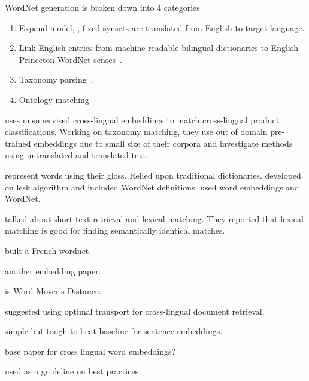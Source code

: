 WordNet generation is broken down into 4 categories
\begin{enumerate}
    \item Expand model, \textcite{vossen_introduction_1998}, fixed synsets are translated from English to target language.
    \item Link English entries from machine-readable bilingual dictionaries to English Princeton WordNet senses~\textcite{knight_building_1994}.
    \item Taxonomy parsing~\textcite{farreres_using_1998}.
    \item Ontology matching~\textcite{farreres_towards_2004}
\end{enumerate}

\textcite{gordeev_unsupervised_2018} uses unsupervised cross-lingual embeddings to match cross-lingual product classifications.
Working on taxonomy matching, they use out of domain pre-trained embeddings due to small size of their corpora and investigate methods using untranslated and translated text.

\textcite{lesk_automatic_1986} represent words using their gloss. Relied upon traditional dictionaries.
\textcite{banerjee_adapted_2002} developed on lesk algorithm and included WordNet definitions.
\textcite{khodak_automated_2017} used word embeddings and WordNet.

\textcite{metzler_similarity_2007} talked about short text retrieval and lexical matching. They reported that lexical matching is good for finding semantically identical matches.

\textcite{sagot_building_2008} built a French wordnet.

\textcite{xiao_distributed_2014} another embedding paper.

\textcite{kusner_word_2015} is Word Mover's Distance.

\textcite{balikas_cross-lingual_2018} suggested using optimal transport for cross-lingual document retrieval.

\textcite{arora_simple_2016} simple but tough-to-beat baseline for sentence embeddings.

\textcite{klementiev_inducing_2012} base paper for cross lingual word embeddings?

\textcite{irvine_comprehensive_2017} used as a guideline on best practices.

